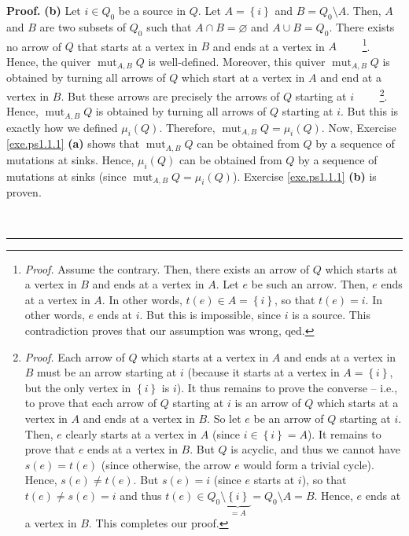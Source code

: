 \documentclass[numbers=enddot,12pt,final,onecolumn,notitlepage]{scrartcl}%
\numberwithin{exer}{section}
\theoremstyle{definition}
\newenvironment{proof}[1][Proof]{\noindent\textbf{#1.} }{\ \rule{0.5em}{0.5em}}
\begin{document}
\begin{proof}
\textbf{(b)} Let $i\in Q_{0}$ be a source in $Q$. Let $A=\left\{  i\right\}  $
and $B=Q_{0}\setminus A$. Then, $A$ and $B$ are two subsets of $Q_{0}$ such
that $A\cap B=\varnothing$ and $A\cup B=Q_{0}$. There exists no arrow of $Q$
that starts at a vertex in $B$ and ends at a vertex in $A$%
\ \ \ \ \footnote{\textit{Proof.} Assume the contrary. Then, there exists an
arrow of $Q$ which starts at a vertex in $B$ and ends at a vertex in $A$. Let
$e$ be such an arrow. Then, $e$ ends at a vertex in $A$. In other words,
$t\left(  e\right)  \in A=\left\{  i\right\}  $, so that $t\left(  e\right)
=i$. In other words, $e$ ends at $i$. But this is impossible, since $i$ is a
source. This contradiction proves that our assumption was wrong, qed.}. Hence,
the quiver $\operatorname*{mut}\nolimits_{A,B}Q$ is well-defined. Moreover,
this quiver $\operatorname*{mut}\nolimits_{A,B}Q$ is obtained by turning all
arrows of $Q$ which start at a vertex in $A$ and end at a vertex in $B$. But
these arrows are precisely the arrows of $Q$ starting at $i$%
\ \ \ \ \footnote{\textit{Proof.} Each arrow of $Q$ which starts at a vertex
in $A$ and ends at a vertex in $B$ must be an arrow starting at $i$ (because
it starts at a vertex in $A=\left\{  i\right\}  $, but the only vertex in
$\left\{  i\right\}  $ is $i$). It thus remains to prove the converse -- i.e.,
to prove that each arrow of $Q$ starting at $i$ is an arrow of $Q$ which
starts at a vertex in $A$ and ends at a vertex in $B$. So let $e$ be an arrow
of $Q$ starting at $i$. Then, $e$ clearly starts at a vertex in $A$ (since
$i\in\left\{  i\right\}  =A$). It remains to prove that $e$ ends at a vertex
in $B$. But $Q$ is acyclic, and thus we cannot have $s\left(  e\right)
=t\left(  e\right)  $ (since otherwise, the arrow $e$ would form a trivial
cycle). Hence, $s\left(  e\right)  \neq t\left(  e\right)  $. But $s\left(
e\right)  =i$ (since $e$ starts at $i$), so that $t\left(  e\right)  \neq
s\left(  e\right)  =i$ and thus $t\left(  e\right)  \in Q_{0}\setminus
\underbrace{\left\{  i\right\}  }_{=A}=Q_{0}\setminus A=B$. Hence, $e$ ends at
a vertex in $B$. This completes our proof.}. Hence, $\operatorname*{mut}%
\nolimits_{A,B}Q$ is obtained by turning all arrows of $Q$ starting at $i$.
But this is exactly how we defined $\mu_{i}\left(  Q\right)  $. Therefore,
$\operatorname*{mut}\nolimits_{A,B}Q=\mu_{i}\left(  Q\right)  $. Now, Exercise
\ref{exe.ps1.1.1} \textbf{(a)} shows that $\operatorname*{mut}\nolimits_{A,B}%
Q$ can be obtained from $Q$ by a sequence of mutations at sinks. Hence,
$\mu_{i}\left(  Q\right)  $ can be obtained from $Q$ by a sequence of
mutations at sinks (since $\operatorname*{mut}\nolimits_{A,B}Q=\mu_{i}\left(
Q\right)  $). Exercise \ref{exe.ps1.1.1} \textbf{(b)} is proven.


\end{proof}
\end{document}
